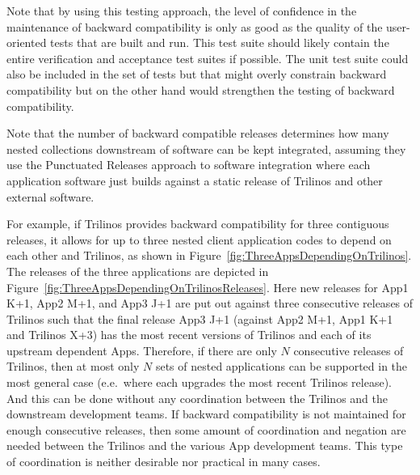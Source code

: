 \documentclass[11pt]{SANDreport}
\begin{document}
Note that by using this testing approach, the level of confidence in
the maintenance of backward compatibility is only as good as the quality
of the user-oriented tests that are built and run.  This test suite
should likely contain the entire verification and acceptance test
suites if possible.  The unit test suite could also be included in the
set of tests but that might overly constrain backward compatibility
but on the other hand would strengthen the testing of backward
compatibility.

Note that the number of backward compatible releases determines how
many nested collections downstream of software can be kept integrated,
assuming they use the Punctuated Releases approach to software
integration {}\cite{SoftwareIntegrationforCSE09} where each
application software just builds against a static release of Trilinos
and other external software.

For example, if Trilinos provides backward compatibility for three
contiguous releases, it allows for up to three nested client
application codes to depend on each other and Trilinos, as shown in
Figure~\ref{fig:ThreeAppsDependingOnTrilinos}.  The releases of the
three applications are depicted in
Figure~\ref{fig:ThreeAppsDependingOnTrilinosReleases}.  Here new
releases for App1 K+1, App2 M+1, and App3 J+1 are put out against
three consecutive releases of Trilinos such that the final release
App3 J+1 (against App2 M+1, App1 K+1 and Trilinos X+3) has the most
recent versions of Trilinos and each of its upstream dependent Apps.
Therefore, if there are only $N$ consecutive releases of Trilinos,
then at most only $N$ sets of nested applications can be supported in
the most general case (e.e.\ where each upgrades the most recent
Trilinos release).  And this can be done without any coordination
between the Trilinos and the downstream development teams.  If
backward compatibility is not maintained for enough consecutive
releases, then some amount of coordination and negation are needed
between the Trilinos and the various App development teams.  This type
of coordination is neither desirable nor practical in many cases.
\end{document}
